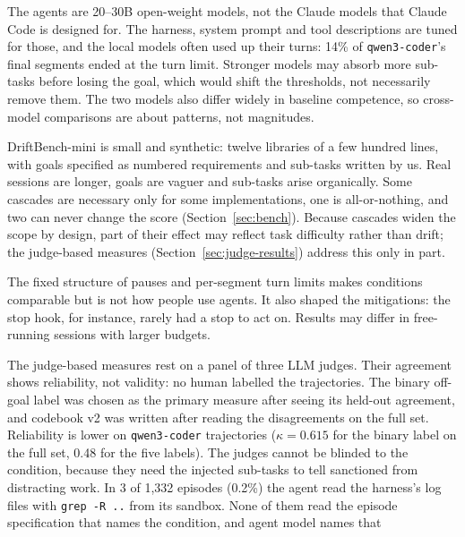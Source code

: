 \begin{description}[leftmargin=0pt]
  \item[Models.] The agents are 20--30B open-weight models, not the Claude models that Claude Code
        is designed for. The harness, system prompt and tool descriptions are tuned for those, and the
        local models often used up their turns: 14\% of \texttt{qwen3-coder}'s final segments ended
        at the turn limit. Stronger models may absorb more sub-tasks
        before losing the goal, which would shift the thresholds, not necessarily remove them. The
        two models also differ widely in baseline competence, so cross-model comparisons are about
        patterns, not magnitudes.
  \item[Benchmark.] DriftBench-mini is small and synthetic: twelve libraries of a few hundred
        lines, with goals specified as numbered requirements and sub-tasks written by us. Real
        sessions are longer, goals are vaguer and sub-tasks arise organically. Some cascades are
        necessary only for some implementations, one is all-or-nothing, and two can never change the
        score (Section~\ref{sec:bench}). Because cascades widen the scope by design, part of their
        effect may reflect task difficulty rather than drift; the judge-based measures
        (Section~\ref{sec:judge-results}) address this only in part.
  \item[Protocol.] The fixed structure of pauses and per-segment turn limits makes conditions
        comparable but is not how people use agents. It also shaped the mitigations: the stop hook,
        for instance, rarely had a stop to act on. Results may differ in free-running sessions with
        larger budgets.
  \item[Judges.] The judge-based measures rest on a panel of three LLM judges. Their agreement
        shows reliability, not validity: no human labelled the trajectories. The binary off-goal
        label was chosen as the primary measure after seeing its held-out agreement, and codebook v2
        was written after reading the disagreements on the full set. Reliability is lower on
        \texttt{qwen3-coder} trajectories ($\kappa=0.615$ for the binary label on the full set, 0.48 for
        the five labels). The judges cannot be blinded to the condition, because they need the injected
        sub-tasks to tell sanctioned from distracting work. In 3 of 1{,}332 episodes (0.2\%) the
        agent read the harness's log files with \texttt{grep -R ..} from its sandbox. None of
        them read the episode specification that names the condition, and agent model names that

\end{description}
